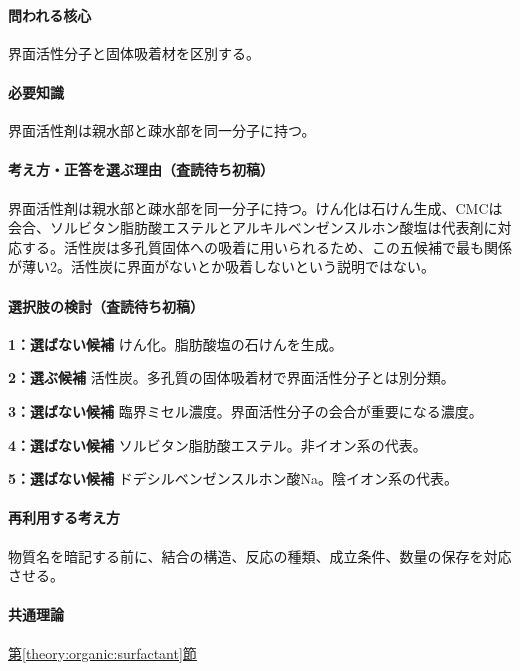 \paragraph{問われる核心} 界面活性分子と固体吸着材を区別する。

\paragraph{必要知識} 界面活性剤は親水部と疎水部を同一分子に持つ。

\paragraph{考え方・正答を選ぶ理由（査読待ち初稿）} 界面活性剤は親水部と疎水部を同一分子に持つ。けん化は石けん生成、CMCは会合、ソルビタン脂肪酸エステルとアルキルベンゼンスルホン酸塩は代表剤に対応する。活性炭は多孔質固体への吸着に用いられるため、この五候補で最も関係が薄い2。活性炭に界面がないとか吸着しないという説明ではない。

\paragraph{選択肢の検討（査読待ち初稿）}\mbox{}\par

\noindent\textbf{1：選ばない候補} けん化。脂肪酸塩の石けんを生成。\par

\noindent\textbf{2：選ぶ候補} 活性炭。多孔質の固体吸着材で界面活性分子とは別分類。\par

\noindent\textbf{3：選ばない候補} 臨界ミセル濃度。界面活性分子の会合が重要になる濃度。\par

\noindent\textbf{4：選ばない候補} ソルビタン脂肪酸エステル。非イオン系の代表。\par

\noindent\textbf{5：選ばない候補} ドデシルベンゼンスルホン酸Na。陰イオン系の代表。\par

\paragraph{再利用する考え方} 物質名を暗記する前に、結合の構造、反応の種類、成立条件、数量の保存を対応させる。

\paragraph{共通理論} \hyperref[theory:organic:surfactant]{第\ref*{theory:organic:surfactant}節}

